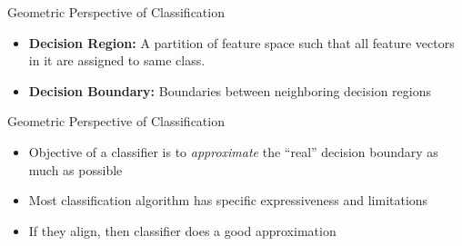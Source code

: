 \documentclass{beamer}
\begin{document}
\begin{frame}{Geometric Perspective of Classification}
    \begin{itemize}
        \item {\bf Decision Region:} A partition of feature space such that all feature vectors in it are assigned to same class.
        \item {\bf Decision Boundary:} Boundaries between neighboring decision regions
    \end{itemize}
\end{frame}


\begin{frame}{Geometric Perspective of Classification}
    \begin{itemize}
        \item Objective of a classifier is to {\em approximate} the ``real'' decision boundary as much as possible 
        \item Most classification algorithm has specific expressiveness and limitations
        \item If they align, then classifier does a good approximation
    \end{itemize}
\end{frame}
\end{document}
